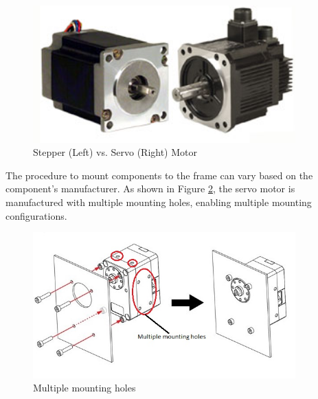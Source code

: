 \begin{figure}[H]
    \centering
    \includegraphics[width=0.9\textwidth]{Sections/LiteratureReview/img/LegAssembly/StepeprServo.jpg}
    \caption{Stepper (Left) vs. Servo (Right) Motor \cite{amci_stepper_nodate}}
    \label{fig:StepperServo}
\end{figure}


The procedure to mount components to the frame can vary based on the component's manufacturer. As shown in Figure \ref{fig:configuration_chassis_mounting}, the servo motor is manufactured with multiple mounting holes, enabling multiple mounting configurations.

\begin{figure}[H]
    \centering
    \includegraphics[width=0.9\textwidth]{Sections/LiteratureReview/img/Chasis/Mounting_frame.jpg}
    \caption{Multiple mounting holes \cite{robotis_e-manual_robotis_nodate}}
    \label{fig:configuration_chassis_mounting}
\end{figure}

 \mbox{}\\

